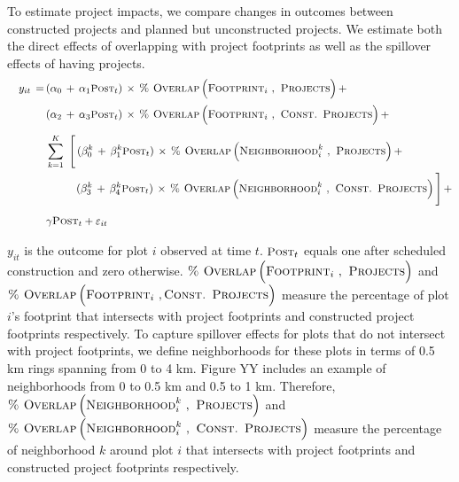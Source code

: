\documentclass[12pt]{article}
\begin{document}
To estimate project impacts, we compare changes in outcomes between constructed projects and planned but unconstructed projects.  We estimate both the direct effects of overlapping with project footprints as well as the spillover effects of  having projects.
\begin{align}
\begin{split}
\quad y_{it} \, =\, & ( \alpha_0 \, +  \, \alpha_1 \textsc{\small Post}_{t}) \, \times \, \textsc{\% Overlap} \,\Big(\textsc{Footprint}_i \,\, , \textsc{ Projects} \Big) \, + \\[.2em]
& ( \alpha_2 \, +  \, \alpha_3 \textsc{\small Post}_{t})  \, \times \, \textsc{\% Overlap} \,\Big(\textsc{Footprint}_i \,\, , \textsc{ Const. Projects} \Big)  \, + \\[.5em]
&\sum_{k=1}^{K} \,\, \Bigg[ \, (\beta_{0}^{k} \,+\, \beta_{1}^{k} \textsc{\small Post}_{t})  \, \times \, \textsc{\% Overlap} \,\Big(\textsc{Neighborhood}^{k}_i \,\, , \textsc{ Projects} \Big) \, + \\
&\hspace{2.8em}(\beta_{3}^{k} \,+\, \beta_{4}^{k} \textsc{\small Post}_{t})  \, \times \,\textsc{\% Overlap} \,\Big(\textsc{Neighborhood}^{k}_i \,\, , \textsc{ Const. Projects} \Big)  \, \Bigg] \, +  \\[.5em]
&\gamma\textsc{Post}_t + \varepsilon_{it}
\end{split}
\end{align}

\noindent $y_{it}$ is the outcome for plot $i$ observed at time $t$.  $\textsc{\small Post}_{t}$ equals one after scheduled construction and zero otherwise.  $\textsc{\% Overlap} \,\Big(\textsc{Footprint}_i \,\, , \textsc{ Projects} \Big)$ and \\ $\textsc{\% Overlap} \,\Big(\textsc{Footprint}_i \,\, , \textsc{Const. Projects} \Big)$ measure the percentage of plot $i$'s footprint that intersects with project footprints and constructed project footprints respectively.  To capture spillover effects for plots that do not intersect with project footprints, we define neighborhoods for these plots in terms of 0.5 km rings spanning from 0 to 4 km.  Figure YY includes an example of neighborhoods from 0 to 0.5 km and 0.5 to 1 km.  Therefore, $\textsc{\% Overlap} \,\Big(\textsc{Neighborhood}^{k}_i \,\, , \textsc{ Projects} \Big)$  and  \\ $\textsc{\% Overlap} \,\Big(\textsc{Neighborhood}^{k}_i \,\, , \textsc{ Const. Projects} \Big)$ measure the percentage of neighborhood $k$ around plot $i$ that intersects with project footprints and constructed project footprints respectively. 
\end{document}
